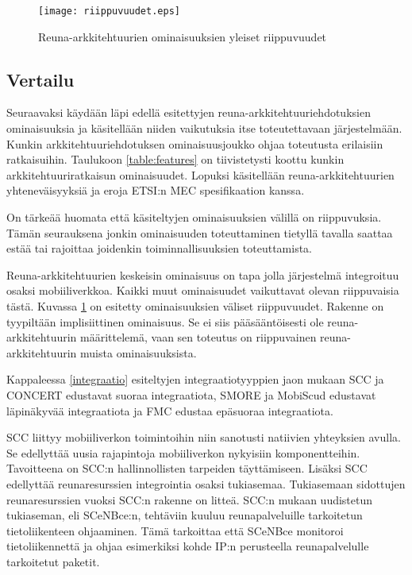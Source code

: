 \begin{figure}[tb]
\centering
\texttt{[image: riippuvuudet.eps]}
\caption{Reuna-arkkitehtuurien ominaisuuksien yleiset riippuvuudet} \label{fig:riippuvuudet}
\end{figure}

\subsection{Vertailu}
Seuraavaksi käydään läpi edellä esitettyjen reuna-arkkitehtuuriehdotuksien ominaisuuksia ja käsitellään niiden vaikutuksia itse toteutettavaan järjestelmään.
Kunkin arkkitehtuuriehdotuksen ominaisuusjoukko ohjaa toteutusta erilaisiin ratkaisuihin. Taulukoon \ref{table:features} on tiivistetysti koottu kunkin arkkitehtuuriratkaisun ominaisuudet.
Lopuksi käsitellään reuna-arkkitehtuurien yhteneväisyyksiä ja eroja ETSI:n MEC spesifikaation kanssa.

On tärkeää huomata että käsiteltyjen ominaisuuksien välillä on riippuvuksia. Tämän seurauksena jonkin ominaisuuden toteuttaminen tietyllä tavalla saattaa estää tai rajoittaa joidenkin toiminnallisuuksien toteuttamista. 


Reuna-arkkitehtuurien keskeisin ominaisuus on tapa jolla järjestelmä integroituu osaksi mobiiliverkkoa. Kaikki muut ominaisuudet vaikuttavat olevan riippuvaisia tästä.
Kuvassa \ref{fig:riippuvuudet} on esitetty ominaisuuksien väliset riippuvuudet.
Rakenne on tyypiltään implisiittinen ominaisuus. Se ei siis pääsääntöisesti ole reuna-arkkitehtuurin määrittelemä, vaan sen toteutus on riippuvainen reuna-arkkitehtuurin muista ominaisuuksista.

Kappaleessa \ref{integraatio} esiteltyjen integraatiotyyppien jaon mukaan SCC ja CONCERT edustavat suoraa integraatiota, SMORE ja MobiScud edustavat läpinäkyvää integraatiota ja FMC edustaa epäsuoraa integraatiota.

SCC liittyy mobiiliverkon toimintoihin niin sanotusti natiivien yhteyksien avulla. Se edellyttää uusia rajapintoja mobiiliverkon nykyisiin komponentteihin. Tavoitteena on SCC:n hallinnollisten tarpeiden täyttämiseen. Lisäksi SCC edellyttää reunaresurssien integrointia osaksi tukiasemaa. 
Tukiasemaan sidottujen reunaresurssien vuoksi SCC:n rakenne on litteä. 
SCC:n mukaan uudistetun tukiaseman, eli SCeNBce:n, tehtäviin kuuluu reunapalveluille tarkoitetun tietoliikenteen ohjaaminen. Tämä tarkoittaa että SCeNBce monitoroi tietoliikennettä ja ohjaa esimerkiksi kohde IP:n perusteella reunapalvelulle tarkoitetut paketit.


